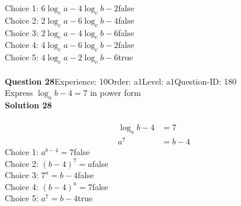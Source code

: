 \documentclass{article}
\begin{document}
Choice 1: \hspace{20pt}$6\log_{c}a-4\log_{c}b-2$\hspace{20pt}false\\
Choice 2: \hspace{20pt}$2\log_{c}a-6\log_{c}b-4$\hspace{20pt}false\\
Choice 3: \hspace{20pt}$2\log_{c}a-4\log_{c}b-6$\hspace{20pt}false\\
Choice 4: \hspace{20pt}$4\log_{c}a-6\log_{c}b-2$\hspace{20pt}false\\
Choice 5: \hspace{20pt}$4\log_{c}a-2\log_{c}b-6$\hspace{20pt}true\\
\\[4pt]
\noindent\textbf{Question 28}\hspace{20pt}Experience: 10\hspace{20pt}Order: a1\hspace{20pt}Level: a1\hspace{20pt}Question-ID: 180\\[2pt]
Express $\log_{a}b-4=7$ in power form\\[4pt]
\noindent\textbf{Solution 28}\\[2pt]
\\[-35pt]\begin{align*}
\log_{a}b-4&=7\\[2pt]
a^7&=b-4
\end{align*}
Choice 1: \hspace{20pt}$a^{b-4}=7$\hspace{20pt}false\\
Choice 2: \hspace{20pt}$(b-4)^7=a$\hspace{20pt}false\\
Choice 3: \hspace{20pt}$7^a=b-4$\hspace{20pt}false\\
Choice 4: \hspace{20pt}$(b-4)^a=7$\hspace{20pt}false\\
Choice 5: \hspace{20pt}$a^7=b-4$\hspace{20pt}true\\
\\[4pt]
\end{document}
